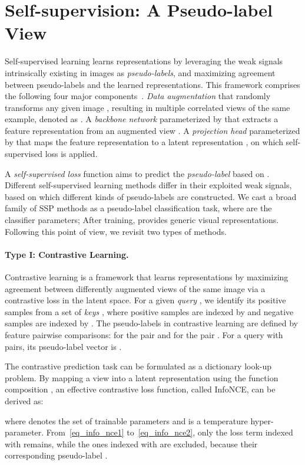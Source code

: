\documentclass[10pt,twocolumn,letterpaper]{article}
\begin{document}
\section{Self-supervision: A Pseudo-label View}


Self-supervised learning learns representations
by leveraging the weak signals intrinsically existing in images as {\em pseudo-labels}, and  
maximizing agreement between pseudo-labels and the learned representations. This framework
comprises the following four major components~\cite{chen2020simple}.
 {\em Data augmentation} that randomly transforms
any given image , resulting in multiple correlated views of the same example, denoted as .
 A {\em backbone network}  parameterized by  that extracts a feature representation  from an augmented view .
 A {\em projection head}  parameterized by  that maps the feature
representation  to a latent representation , on which self-supervised loss is
applied. 

A {\em  self-supervised loss} function aims to predict the {\em pseudo-label}  based on . Different self-supervised learning methods differ in their exploited weak signals, based on which different kinds of pseudo-labels are constructed. We cast a broad family of SSP methods as a pseudo-label classification task, where  are the classifier parameters; After training,  provides generic visual representations.
Following this point of view, we revisit two types of methods. 


\paragraph{Type I: Contrastive Learning.}
Contrastive learning is a framework that learns representations
by maximizing agreement between differently augmented
views of the same image via a contrastive loss in
the latent space.
For a given {\em query} ,  we identify its positive samples  from a set of {\em keys} , where positive samples are indexed by  and negative samples are indexed by . The pseudo-labels in contrastive learning are defined by feature pairwise comparisons:  for the pair  and  for the pair . For a query with  pairs, its pseudo-label vector is . 


The contrastive prediction task can be formulated as a dictionary look-up problem. By mapping a view  into a latent representation  using the function composition ,
an effective contrastive loss function, called InfoNCE, can be derived as:

where  denotes the set of  trainable parameters  and  is a temperature hyper-parameter. From~\eqref{eq_info_nce1} to~\eqref{eq_info_nce2}, only the loss term indexed with  remains, while the ones indexed with  are excluded, because their corresponding pseudo-label .
\end{document}
